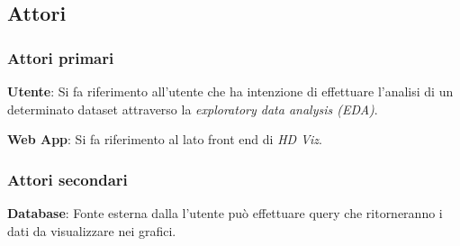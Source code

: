\documentclass[../analisi_dei_requisiti.tex]{subfiles}
\begin{document}
%
\subsection{Attori}%
\label{subs:attori}

\subsubsection{Attori primari}%
\label{sssec:attori_primari}
\begin{description}
 \item \textbf{Utente}: Si fa riferimento all'utente che ha intenzione di effettuare l'analisi di un determinato dataset attraverso la \emph{exploratory data analysis (EDA)}.
 \item \textbf{Web App}: Si fa riferimento al lato front end di \emph{HD Viz}.
\end{description}

\subsubsection{Attori secondari}
\label{sssec:attori_secondari}
\begin{description}
    \item \textbf{Database}: Fonte esterna dalla l'utente può effettuare query che ritorneranno i dati da visualizzare nei grafici.
\end{description}


\newpage

\newpage

\newpage

\newpage

\newpage





\end{document}
